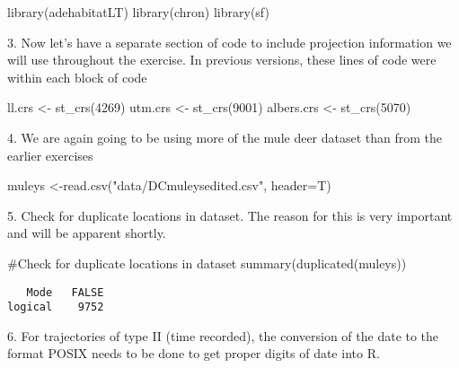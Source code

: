 \documentclass[
  letterpaper,
]{book}
\newenvironment{Shaded}{\begin{snugshade}}{\end{snugshade}}
\newcommand{\AttributeTok}[1]{\textcolor[rgb]{0.40,0.45,0.13}{#1}}
\newcommand{\CommentTok}[1]{\textcolor[rgb]{0.37,0.37,0.37}{#1}}
\newcommand{\DecValTok}[1]{\textcolor[rgb]{0.68,0.00,0.00}{#1}}
\newcommand{\FunctionTok}[1]{\textcolor[rgb]{0.28,0.35,0.67}{#1}}
\newcommand{\NormalTok}[1]{\textcolor[rgb]{0.00,0.23,0.31}{#1}}
\newcommand{\OtherTok}[1]{\textcolor[rgb]{0.00,0.23,0.31}{#1}}
\newcommand{\StringTok}[1]{\textcolor[rgb]{0.13,0.47,0.30}{#1}}
\begin{document}
\begin{Shaded}
\begin{Highlighting}[]
\FunctionTok{library}\NormalTok{(adehabitatLT)}
\FunctionTok{library}\NormalTok{(chron)}
\FunctionTok{library}\NormalTok{(sf)}
\end{Highlighting}
\end{Shaded}

3. Now let's have a separate section of code to include projection
information we will use throughout the exercise. In previous versions,
these lines of code were within each block of code

\begin{Shaded}
\begin{Highlighting}[]
\NormalTok{ll.crs }\OtherTok{\textless{}{-}} \FunctionTok{st\_crs}\NormalTok{(}\DecValTok{4269}\NormalTok{)}
\NormalTok{utm.crs }\OtherTok{\textless{}{-}} \FunctionTok{st\_crs}\NormalTok{(}\DecValTok{9001}\NormalTok{)}
\NormalTok{albers.crs }\OtherTok{\textless{}{-}} \FunctionTok{st\_crs}\NormalTok{(}\DecValTok{5070}\NormalTok{)}
\end{Highlighting}
\end{Shaded}

4. We are again going to be using more of the mule deer dataset than
from the earlier exercises

\begin{Shaded}
\begin{Highlighting}[]
\NormalTok{muleys }\OtherTok{\textless{}{-}}\FunctionTok{read.csv}\NormalTok{(}\StringTok{"data/DCmuleysedited.csv"}\NormalTok{, }\AttributeTok{header=}\NormalTok{T)}
\end{Highlighting}
\end{Shaded}

5. Check for duplicate locations in dataset. The reason for this is very
important and will be apparent shortly.

\begin{Shaded}
\begin{Highlighting}[]
\CommentTok{\#Check for duplicate locations in dataset}
\FunctionTok{summary}\NormalTok{(}\FunctionTok{duplicated}\NormalTok{(muleys))}
\end{Highlighting}
\end{Shaded}

\begin{verbatim}
   Mode   FALSE 
logical    9752 
\end{verbatim}

6. For trajectories of type II (time recorded), the conversion of the
date to the format POSIX needs to be done to get proper digits of date
into R.
\end{document}
